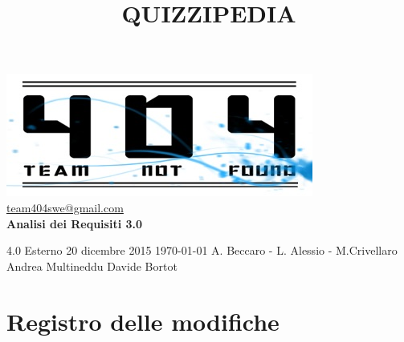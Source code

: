 \documentclass[a4paper,11pt]{article}
\title{\textbf{{\fontsize{8mm}{5mm}\selectfont QUIZZIPEDIA}}}
\date{}
\author{}
\begin{document}
	\maketitle
	\thispagestyle{empty}
	\begin{center}
	\includegraphics{team_not_found.jpg}\\
	\fontsize{5mm}{3mm}\url{team404swe@gmail.com}\\
	
	\vspace{50mm}
	\textbf{Analisi dei Requisiti 3.0}
	\end{center}
	
			{4.0} 							%
			{Esterno} 						%
			{20 dicembre 2015} 				%
			{\today} 						%
			{A. Beccaro - L. Alessio - M.Crivellaro}	%
			{Andrea Multineddu} 				%
			{Davide Bortot} 		%
	\newpage
	\thispagestyle{empty}
	\null
	\newpage
		
	\hspace{30 mm}
	\fancyfoot[R]{\thepage}
	\section*{Registro delle modifiche}
	
\end{document}

